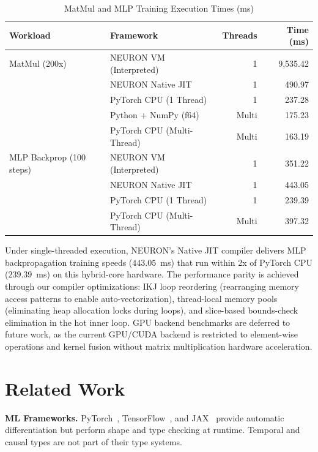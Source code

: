 \documentclass[11pt,a4paper]{article}
\begin{document}
\begin{table}[h]
\centering
\caption{MatMul and MLP Training Execution Times (ms)}
\label{tab:benchmarks}
\begin{tabular}{llrr}
\toprule
\textbf{Workload} & \textbf{Framework} & \textbf{Threads} & \textbf{Time (ms)} \\
\midrule
MatMul (200x) & NEURON VM (Interpreted) & 1 & 9,535.42 \\
& NEURON Native JIT & 1 & 490.97 \\
& PyTorch CPU (1 Thread) & 1 & 237.28 \\
& Python + NumPy (f64) & Multi & 175.23 \\
& PyTorch CPU (Multi-Thread) & Multi & 163.19 \\
\midrule
MLP Backprop (100 steps) & NEURON VM (Interpreted) & 1 & 351.22 \\
& NEURON Native JIT & 1 & 443.05 \\
& PyTorch CPU (1 Thread) & 1 & 239.39 \\
& PyTorch CPU (Multi-Thread) & Multi & 397.32 \\
\bottomrule
\end{tabular}
\end{table}

Under single-threaded execution, NEURON's Native JIT compiler delivers MLP backpropagation training speeds ($443.05$~ms) that run within 2x of PyTorch CPU ($239.39$~ms) on this hybrid-core hardware. The performance parity is achieved through our compiler optimizations: IKJ loop reordering (rearranging memory access patterns to enable auto-vectorization), thread-local memory pools (eliminating heap allocation locks during loops), and slice-based bounds-check elimination in the hot inner loop. GPU backend benchmarks are deferred to future work, as the current GPU/CUDA backend is restricted to element-wise operations and kernel fusion without matrix multiplication hardware acceleration.


\section{Related Work}

\textbf{ML Frameworks.} PyTorch~\cite{paszke2019}, TensorFlow~\cite{abadi2016}, and JAX~\cite{bradbury2018} provide automatic differentiation but perform shape and type checking at runtime. Temporal and causal types are not part of their type systems.
\end{document}
